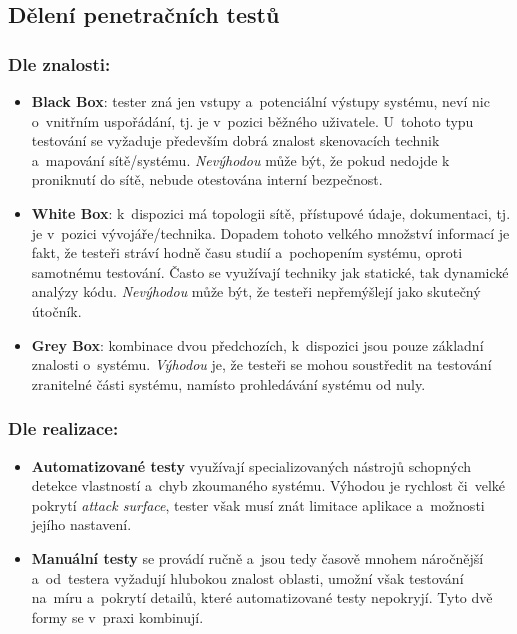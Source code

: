 \subsection{Dělení penetračních testů}

\subsubsection*{Dle znalosti:}

\begin{itemize}
    \item \textbf{Black Box}: tester zná jen vstupy a~potenciální výstupy systému, neví nic o~vnitřním uspořádání, tj. je v~pozici běžného uživatele. U~tohoto typu testování se vyžaduje především dobrá znalost skenovacích technik a~mapování sítě/systému. \textit{Nevýhodou} může být, že pokud nedojde k proniknutí do sítě, nebude otestována interní bezpečnost.

    \item \textbf{White Box}: k~dispozici má topologii sítě, přístupové údaje, dokumentaci, tj. je v~pozici vývojáře/technika. Dopadem tohoto velkého množství informací je fakt, že testeři stráví hodně času studií a~pochopením systému, oproti samotnému testování. Často se využívají techniky jak statické, tak dynamické analýzy kódu. \textit{Nevýhodou} může být, že testeři nepřemýšlejí jako skutečný útočník.

    \item \textbf{Grey Box}: kombinace dvou předchozích, k~dispozici jsou pouze základní znalosti o~systému. \textit{Výhodou} je, že testeři se mohou soustředit na testování zranitelné části systému, namísto prohledávání systému od nuly.
\end{itemize}

\subsubsection*{Dle realizace:}

\begin{itemize}
    \item \textbf{Automatizované testy} využívají specializovaných nástrojů schopných detekce vlastností a~chyb zkoumaného systému. Výhodou je rychlost či~velké pokrytí \emph{attack surface}, tester však musí znát limitace aplikace a~možnosti jejího nastavení.

    \item \textbf{Manuální testy} se provádí ručně a~jsou tedy časově mnohem náročnější a~od~testera vyžadují hlubokou znalost oblasti, umožní však testování na~míru a~pokrytí detailů, které automatizované testy nepokryjí. Tyto dvě formy se v~praxi kombinují.
\end{itemize}
